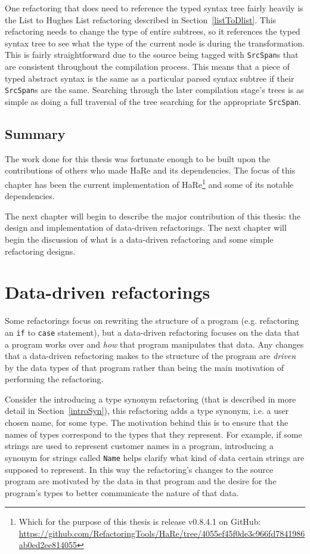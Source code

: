 One refactoring that does need to reference the typed syntax tree fairly heavily is the List to Hughes List refactoring described in Section~\ref{listToDlist}. This refactoring needs to change the type of entire subtrees, so it references the typed syntax tree to see what the type of the current node is during the transformation. This is fairly straightforward due to the source being tagged with \texttt{SrcSpan}s that are consistent throughout the compilation process. This means that a piece of typed abstract syntax is the same as a particular parsed syntax subtree if their \texttt{SrcSpan}s are the same. Searching through the later compilation stage's trees is as simple as doing a full traversal of the tree searching for the appropriate \texttt{SrcSpan}.

\section{Summary}

The work done for this thesis was fortunate enough to be built upon the contributions of others who made HaRe and its dependencies. The focus of this chapter has been the current implementation of HaRe\footnote{Which for the purpose of this thesis is release v0.8.4.1 on GitHub: \url{https://github.com/RefactoringTools/HaRe/tree/4055ef45f0de3c966fd7841986ab0ed2ee814055}} and some of its notable dependencies.

The next chapter will begin to describe the major contribution of this thesis: the design and implementation of data-driven refactorings. The next chapter will begin the discussion of what is a data-driven refactoring and some simple refactoring designs.

\chapter{Data-driven refactorings}
\label{chp:ddRefs}

Some refactorings focus on rewriting the structure of a program (e.g. refactoring an \texttt{if} to \texttt{case} statement), but a data-driven refactoring focuses on the data that a program works over and \textit{how} that program manipulates that data. Any changes that a data-driven refactoring makes to the structure of the program are \textit{driven} by the data types of that program rather than being the main motivation of performing the refactoring. 

Consider the introducing a type synonym refactoring (that is described in  more detail in Section~\ref{introSyn}), this refactoring adds a type synonym, i.e. a user chosen name, for some type. The motivation behind this is to ensure that the names of types correspond to the types that they represent. For example, if some strings are used to represent customer names in a program, introducing a synonym for strings called \texttt{Name} helps clarify what kind of data certain strings are supposed to represent. In this way the refactoring's changes to the source program are motivated by the data in that program and the desire for the program's types to better communicate the nature of that data.

